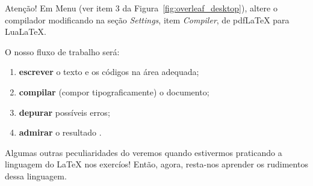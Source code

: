 \begin{atencao}{Atenção!}{\exclamacao}
  Em \textsf{Menu} (ver item 3 da Figura~\ref{fig:overleaf_desktop}), altere o
  compilador modificando na seção \textit{Settings}, item \textit{Compiler}, de
  \textsf{pdfLaTeX} para \textsf{LuaLaTeX}.
\end{atencao}

O nosso fluxo de trabalho será:

\begin{enumerate}[\ding{226}]
  \item \textbf{\textsf{escrever}} o texto e os códigos na área adequada;
  \item \textbf{\textsf{compilar}} (compor tipograficamente) o documento;
  \item \textbf{\textsf{depurar}} possíveis erros;
  \item \textbf{\textsf{admirar}} o resultado .
\end{enumerate}

Algumas outras peculiaridades do \Overleaf{} veremos quando estivermos praticando
a linguagem do \LaTeX{} nos exercíos!
Então, agora, resta-nos aprender os rudimentos dessa linguagem.

\newpage